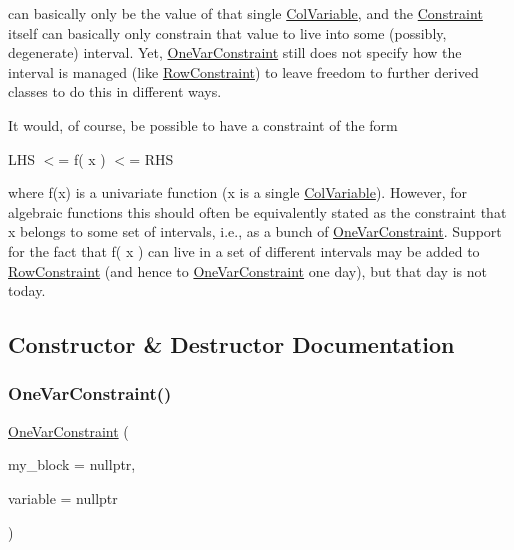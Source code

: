 can basically only be the value of that single \mbox{\hyperlink{class_s_m_spp__di__unipi__it_1_1_col_variable}{Col\+Variable}}, and the \mbox{\hyperlink{class_s_m_spp__di__unipi__it_1_1_constraint}{Constraint}} itself can basically only constrain that value to live into some (possibly, degenerate) interval. Yet, \mbox{\hyperlink{class_s_m_spp__di__unipi__it_1_1_one_var_constraint}{One\+Var\+Constraint}} still does not specify how the interval is managed (like \mbox{\hyperlink{class_s_m_spp__di__unipi__it_1_1_row_constraint}{Row\+Constraint}}) to leave freedom to further derived classes to do this in different ways.

It would, of course, be possible to have a constraint of the form

L\+HS $<$= f( x ) $<$= R\+HS

where f(x) is a univariate function (x is a single \mbox{\hyperlink{class_s_m_spp__di__unipi__it_1_1_col_variable}{Col\+Variable}}). However, for algebraic functions this should often be equivalently stated as the constraint that x belongs to some set of intervals, i.\+e., as a bunch of \mbox{\hyperlink{class_s_m_spp__di__unipi__it_1_1_one_var_constraint}{One\+Var\+Constraint}}. Support for the fact that f( x ) can live in a set of different intervals may be added to \mbox{\hyperlink{class_s_m_spp__di__unipi__it_1_1_row_constraint}{Row\+Constraint}} (and hence to \mbox{\hyperlink{class_s_m_spp__di__unipi__it_1_1_one_var_constraint}{One\+Var\+Constraint}} one day), but that day is not today. 

\subsection{Constructor \& Destructor Documentation}
\mbox{\label{class_s_m_spp__di__unipi__it_1_1_one_var_constraint_a24c42521f93a4b7b062798ff9248c597}} 
\subsubsection{\texorpdfstring{One\+Var\+Constraint()}{OneVarConstraint()}}
{\footnotesize\ttfamily \mbox{\hyperlink{class_s_m_spp__di__unipi__it_1_1_one_var_constraint}{One\+Var\+Constraint}} (\begin{DoxyParamCaption}\item[{\mbox{\hyperlink{class_s_m_spp__di__unipi__it_1_1_block}{Block}} $\ast$}]{my\+\_\+block = {\ttfamily nullptr},  }\item[{\mbox{\hyperlink{class_s_m_spp__di__unipi__it_1_1_col_variable}{Col\+Variable}} $\ast$const}]{variable = {\ttfamily nullptr} }\end{DoxyParamCaption})\hspace{0.3cm}{\ttfamily [inline]}}



